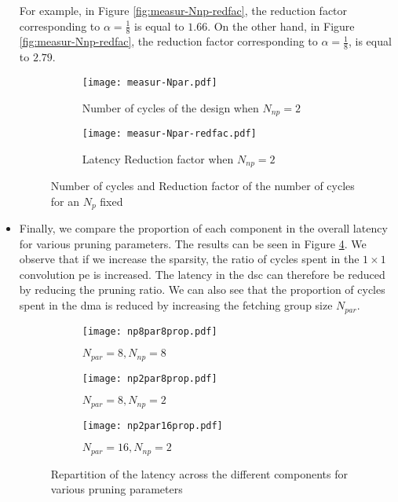 \begin{itemize}
    For example, in Figure \ref{fig:measur-Nnp-redfac}, the reduction factor corresponding to $\alpha = \frac{1}{8}$ is equal to $1.66$. On the other hand,
    in Figure \ref{fig:measur-Nnp-redfac}, the reduction factor corresponding to $\alpha = \frac{1}{8}$, is equal to $2.79$.
    \begin{figure}[H]
        \centering
        \begin{subfigure}[t]{.49\textwidth}
            \centering
            \texttt{[image: measur-Npar.pdf]}
            \caption{Number of cycles of the design when $N_{np} = 2$}
            \label{fig:measur-Npar}
        \end{subfigure}
        \begin{subfigure}[t]{.49\textwidth}
            \centering
            \texttt{[image: measur-Npar-redfac.pdf]}
            \caption{Latency Reduction factor when $N_{np} = 2$}
            \label{fig:measur-Npar-redfac}
        \end{subfigure}
        \caption{Number of cycles and Reduction factor of the number of cycles for an $N_{p}$ fixed}
    \end{figure}
    \item Finally, we compare the proportion of each component in the overall latency for various pruning parameters. The results can be seen in Figure \ref{fig:ratio-pr}. We observe that if we increase the sparsity, the ratio of cycles spent in the $1 \times 1$ convolution \acrshort{pe} is increased. The latency in the \acrshort{dsc} can therefore be reduced by reducing the pruning ratio. We can also see that the proportion of cycles spent in the \acrshort{dma} is reduced by increasing the fetching group size $N_{par}$.
    \begin{figure}[H]
        \centering
        \begin{subfigure}[t]{.32\textwidth}
            \centering
            \texttt{[image: np8par8prop.pdf]}
            \caption{$N_{par} = 8, N_{np} = 8$}
        \end{subfigure}
        \begin{subfigure}[t]{.32\textwidth}
            \centering
            \texttt{[image: np2par8prop.pdf]}
            \caption{$N_{par} = 8, N_{np} = 2$}
        \end{subfigure}
        \begin{subfigure}[t]{.32\textwidth}
            \centering
            \texttt{[image: np2par16prop.pdf]}
            \caption{$N_{par} = 16, N_{np} = 2$}
        \end{subfigure}
        \caption{Repartition of the latency across the different components for various pruning parameters}
        \label{fig:ratio-pr}
    \end{figure}
\end{itemize}
%
